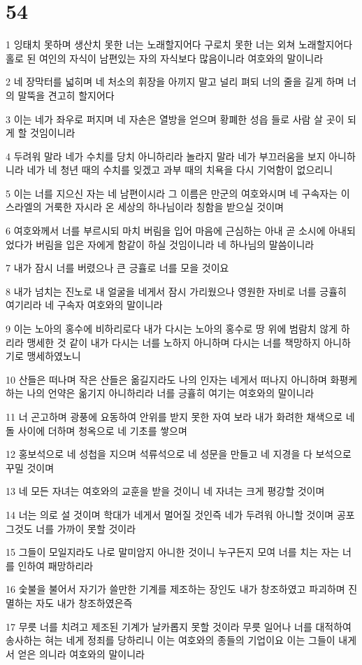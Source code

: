 \chapter{54}

\par 1 잉태치 못하며 생산치 못한 너는 노래할지어다 구로치 못한 너는 외쳐 노래할지어다 홀로 된 여인의 자식이 남편있는 자의 자식보다 많음이니라 여호와의 말이니라
\par 2 네 장막터를 넓히며 네 처소의 휘장을 아끼지 말고 널리 펴되 너의 줄을 길게 하며 너의 말뚝을 견고히 할지어다
\par 3 이는 네가 좌우로 퍼지며 네 자손은 열방을 얻으며 황폐한 성읍 들로 사람 살 곳이 되게 할 것임이니라
\par 4 두려워 말라 네가 수치를 당치 아니하리라 놀라지 말라 네가 부끄러움을 보지 아니하니라 네가 네 청년 때의 수치를 잊겠고 과부 때의 치욕을 다시 기억함이 없으리니
\par 5 이는 너를 지으신 자는 네 남편이시라 그 이름은 만군의 여호와시며 네 구속자는 이스라엘의 거룩한 자시라 온 세상의 하나님이라 칭함을 받으실 것이며
\par 6 여호와께서 너를 부르시되 마치 버림을 입어 마음에 근심하는 아내 곧 소시에 아내되었다가 버림을 입은 자에게 함같이 하실 것임이니라 네 하나님의 말씀이니라
\par 7 내가 잠시 너를 버렸으나 큰 긍휼로 너를 모을 것이요
\par 8 내가 넘치는 진노로 내 얼굴을 네게서 잠시 가리웠으나 영원한 자비로 너를 긍휼히 여기리라 네 구속자 여호와의 말이니라
\par 9 이는 노아의 홍수에 비하리로다 내가 다시는 노아의 홍수로 땅 위에 범람치 않게 하리라 맹세한 것 같이 내가 다시는 너를 노하지 아니하며 다시는 너를 책망하지 아니하기로 맹세하였노니
\par 10 산들은 떠나며 작은 산들은 옮길지라도 나의 인자는 네게서 떠나지 아니하며 화평케 하는 나의 언약은 옮기지 아니하리라 너를 긍휼히 여기는 여호와의 말이니라
\par 11 너 곤고하며 광풍에 요동하여 안위를 받지 못한 자여 보라 내가 화려한 채색으로 네 돌 사이에 더하며 청옥으로 네 기초를 쌓으며
\par 12 홍보석으로 네 성첩을 지으며 석류석으로 네 성문을 만들고 네 지경을 다 보석으로 꾸밀 것이며
\par 13 네 모든 자녀는 여호와의 교훈을 받을 것이니 네 자녀는 크게 평강할 것이며
\par 14 너는 의로 설 것이며 학대가 네게서 멀어질 것인즉 네가 두려워 아니할 것이며 공포 그것도 너를 가까이 못할 것이라
\par 15 그들이 모일지라도 나로 말미암지 아니한 것이니 누구든지 모여 너를 치는 자는 너를 인하여 패망하리라
\par 16 숯불을 불어서 자기가 쓸만한 기계를 제조하는 장인도 내가 창조하였고 파괴하며 진멸하는 자도 내가 창조하였은즉
\par 17 무릇 너를 치려고 제조된 기계가 날카롭지 못할 것이라 무릇 일어나 너를 대적하여 송사하는 혀는 네게 정죄를 당하리니 이는 여호와의 종들의 기업이요 이는 그들이 내게서 얻은 의니라 여호와의 말이니라

